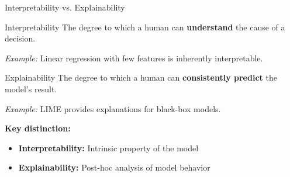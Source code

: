 \documentclass[aspectratio=169]{beamer}
\begin{document}
\begin{frame}{Interpretability vs. Explainability}
  \begin{definitionbox}{Interpretability}
    The degree to which a human can \textbf{understand} the cause of a decision.

    \textit{Example:} Linear regression with few features is inherently interpretable.
  \end{definitionbox}

  \vspace{0.5em}

  \begin{definitionbox}{Explainability}
    The degree to which a human can \textbf{consistently predict} the model's result.

    \textit{Example:} LIME provides explanations for black-box models.
  \end{definitionbox}

  \vspace{0.5em}

  \textbf{Key distinction:}
  \begin{itemize}
    \item \textbf{Interpretability:} Intrinsic property of the model
    \item \textbf{Explainability:} Post-hoc analysis of model behavior
  \end{itemize}
\end{frame}
\end{document}
